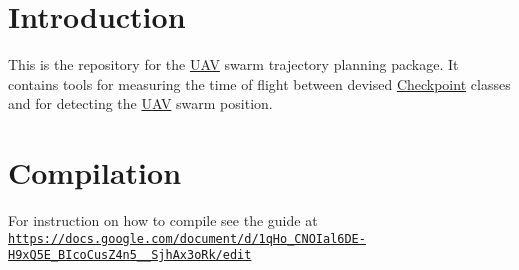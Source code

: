\hypertarget{index_intro_sec}{}\section{Introduction}\label{index_intro_sec}
This is the repository for the \hyperlink{classUAV}{U\+AV} swarm trajectory planning package. It contains tools for measuring the time of flight between devised \hyperlink{classCheckpoint}{Checkpoint} classes and for detecting the \hyperlink{classUAV}{U\+AV} swarm position.\hypertarget{index_install_sec}{}\section{Compilation}\label{index_install_sec}
For instruction on how to compile see the guide at \href{https://docs.google.com/document/d/1qHo_CNOIal6DE-H9xQ5E_BIcoCusZ4n5__SjhAx3oRk/edit}{\tt https\+://docs.\+google.\+com/document/d/1q\+Ho\+\_\+\+C\+N\+O\+Ial6\+D\+E-\/\+H9x\+Q5\+E\+\_\+\+B\+Ico\+Cus\+Z4n5\+\_\+\+\_\+\+Sjh\+Ax3o\+Rk/edit} 